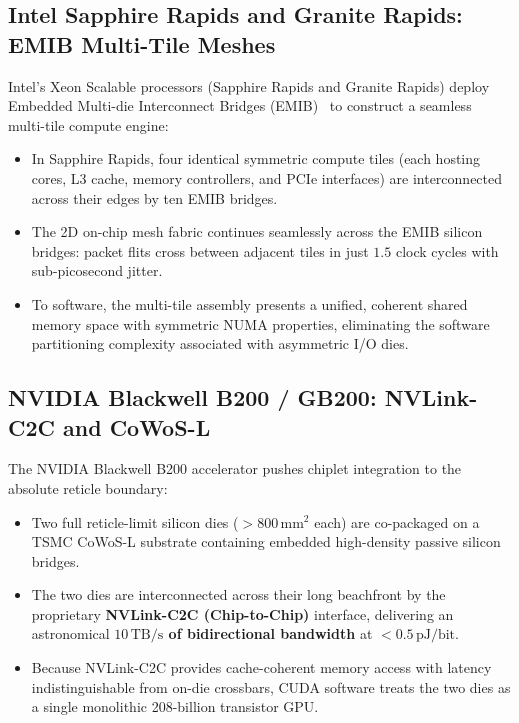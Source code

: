 \subsection{Intel Sapphire Rapids and Granite Rapids: EMIB Multi-Tile Meshes}
Intel's Xeon Scalable processors (Sapphire Rapids and Granite Rapids) deploy Embedded Multi-die Interconnect Bridges (EMIB)~\cite{Mahajan2016} to construct a seamless multi-tile compute engine:
\begin{itemize}
    \item In Sapphire Rapids, four identical symmetric compute tiles (each hosting cores, L3 cache, memory controllers, and PCIe interfaces) are interconnected across their edges by ten EMIB bridges.
    \item The 2D on-chip mesh fabric continues seamlessly across the EMIB silicon bridges: packet flits cross between adjacent tiles in just $1.5$ clock cycles with sub-picosecond jitter.
    \item To software, the multi-tile assembly presents a unified, coherent shared memory space with symmetric NUMA properties, eliminating the software partitioning complexity associated with asymmetric I/O dies.
\end{itemize}

\subsection{NVIDIA Blackwell B200 / GB200: NVLink-C2C and CoWoS-L}
The NVIDIA Blackwell B200 accelerator pushes chiplet integration to the absolute reticle boundary:
\begin{itemize}
    \item Two full reticle-limit silicon dies ($> 800\,\mathrm{mm^2}$ each) are co-packaged on a TSMC CoWoS-L substrate containing embedded high-density passive silicon bridges.
    \item The two dies are interconnected across their long beachfront by the proprietary \textbf{NVLink-C2C (Chip-to-Chip)} interface, delivering an astronomical \textbf{$10\,\mathrm{TB/s}$ of bidirectional bandwidth} at $< 0.5\,\mathrm{pJ/bit}$.
    \item Because NVLink-C2C provides cache-coherent memory access with latency indistinguishable from on-die crossbars, CUDA software treats the two dies as a single monolithic 208-billion transistor GPU.
\end{itemize}

